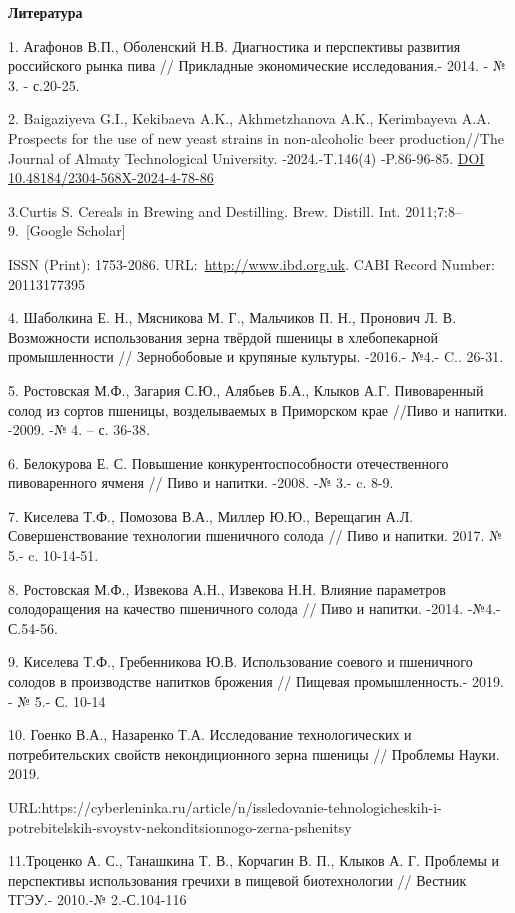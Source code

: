 {\bfseries Литература}

1. Агафонов В.П., Оболенский Н.В. Диагностика и перспективы развития
российского рынка пива // Прикладные экономические исследования.- 2014.
- № 3. - с.20-25.

2. Baigaziyeva G.I., Kekibaeva A.K., Akhmetzhanova A.K., Kerimbayeva
A.A. Prospects for the use of new yeast strains in non-alcoholic beer
production//The Journal of Almaty Technological University.
-2024.-T.146(4) -P.86-96-85.
\href{https://doi.org/10.48184/2304-568X-2024-4-78-86}{DOI
10.48184/2304-568X-2024-4-78-86}

3.Curtis S. Cereals in Brewing and Destilling. Brew. Distill. Int.
2011;7:8--9.~{[}Google Scholar{]}

ISSN (Print): 1753-2086.
URL:~\href{http://www.ibd.org.uk/}{http://www.ibd.org.uk}. CABI Record
Number: 20113177395

4. Шаболкина Е. Н., Мясникова М. Г., Мальчиков П. Н., Пронович Л. В.
Возможности использования зерна твёрдой пшеницы в хлебопекарной
промышленности // Зернобобовые и крупяные культуры. -2016.- №4.- C..
26-31.

5. Ростовская М.Ф., Загария С.Ю., Алябьев Б.А., Клыков А.Г. Пивоваренный
солод из сортов пшеницы, возделываемых в Приморском крае //Пиво и
напитки. -2009. -№ 4. -- с. 36-38.

6. Белокурова Е. С. Повышение конкурентоспособности отечественного
пивоваренного ячменя // Пиво и напитки. -2008. -№ 3.- c. 8-9.

7. Киселева Т.Ф., Помозова В.А., Миллер Ю.Ю., Верещагин А.Л.
Совершенствование технологии пшеничного солода // Пиво и напитки. 2017.
№ 5.- c. 10-14-51.

8. Ростовская М.Ф., Извекова А.Н., Извекова Н.Н. Влияние параметров
солодоращения на качество пшеничного солода // Пиво и напитки. -2014.
-№4.- С.54-56.

9. Киселева Т.Ф., Гребенникова Ю.В. Использование соевого и пшеничного
солодов в производстве напитков брожения // Пищевая промышленность.-
2019. - № 5.- С. 10-14

10. Гоенко В.А., Назаренко Т.А. Исследование технологических и
потребительских свойств некондиционного зерна пшеницы // Проблемы Науки.
2019.

URL:https://cyberleninka.ru/article/n/issledovanie-tehnologicheskih-i-potrebitelskih-svoystv-nekonditsionnogo-zerna-pshenitsy

11.Троценко А. С., Танашкина Т. В., Корчагин В. П., Клыков А. Г.
Проблемы и перспективы использования гречихи в пищевой биотехнологии //
Вестник ТГЭУ.- 2010.-№ 2.-С.104-116

